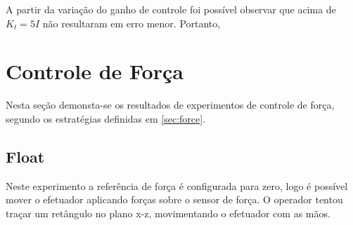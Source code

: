A partir da variação do ganho de controle foi possível observar que acima de ${K}_t = 5 {I}$ não resultaram em erro menor. Portanto,  


\section{Controle de Força}

Nesta seção demonsta-se os resultados de experimentos de controle de força, segundo os estratégias definidas em \ref{sec:force}. 

\subsection{Float}
Neste experimento a referência de força é configurada para zero, logo é possível mover o efetuador aplicando forças sobre o  sensor de força. O operador tentou traçar um retângulo no plano x-z, movimentando o efetuador com as mãos.

